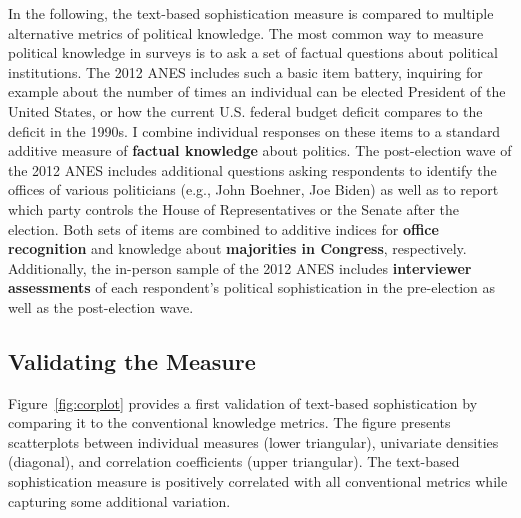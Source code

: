 \documentclass[12pt]{article}
\begin{document}
In the following, the text-based sophistication measure is compared to multiple alternative metrics of political knowledge. The most common way to measure political knowledge in surveys is to ask a set of factual questions about political institutions. The 2012 ANES includes such a basic item battery, inquiring for example about the number of times an individual can be elected President of the United States, or how the current U.S. federal budget deficit compares to the deficit in the 1990s. I combine individual responses on these items to a standard additive measure of \textbf{factual knowledge} about politics. The post-election wave of the 2012 ANES includes additional questions asking respondents to identify the offices of various politicians (e.g., John Boehner, Joe Biden) as well as to report which party controls the House of Representatives or the Senate after the election. Both sets of items are combined to additive indices for \textbf{office recognition} and knowledge about \textbf{majorities in Congress}, respectively. Additionally, the in-person sample of the 2012 ANES includes \textbf{interviewer assessments} of each respondent's political sophistication in the pre-election as well as the post-election wave.


\subsection*{Validating the Measure}

Figure~\ref{fig:corplot} provides a first validation of text-based sophistication by comparing it to the conventional knowledge metrics. The figure presents scatterplots between individual measures (lower triangular), univariate densities (diagonal), and correlation coefficients (upper triangular). The text-based sophistication measure is positively correlated with all conventional metrics while capturing some additional variation.
\end{document}
